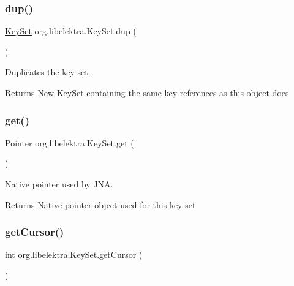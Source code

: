 \subsubsection{\texorpdfstring{dup()}{dup()}}
{\footnotesize\ttfamily \hyperlink{classorg_1_1libelektra_1_1KeySet}{Key\+Set} org.\+libelektra.\+Key\+Set.\+dup (\begin{DoxyParamCaption}{ }\end{DoxyParamCaption})\hspace{0.3cm}{\ttfamily [inline]}}



Duplicates the key set. 

\begin{DoxyReturn}{Returns}
New \hyperlink{classorg_1_1libelektra_1_1KeySet}{Key\+Set} containing the same key references as this object does 
\end{DoxyReturn}
\mbox{\label{classorg_1_1libelektra_1_1KeySet_abf3f028c9c3b88a47aa9d67a5c8e95da}} 
\subsubsection{\texorpdfstring{get()}{get()}}
{\footnotesize\ttfamily Pointer org.\+libelektra.\+Key\+Set.\+get (\begin{DoxyParamCaption}{ }\end{DoxyParamCaption})\hspace{0.3cm}{\ttfamily [inline]}}



Native pointer used by J\+NA. 

\begin{DoxyReturn}{Returns}
Native pointer object used for this key set 
\end{DoxyReturn}
\mbox{\label{classorg_1_1libelektra_1_1KeySet_a37e6d574b4595021a6cc732e325219e1}} 
\subsubsection{\texorpdfstring{get\+Cursor()}{getCursor()}}
{\footnotesize\ttfamily int org.\+libelektra.\+Key\+Set.\+get\+Cursor (\begin{DoxyParamCaption}{ }\end{DoxyParamCaption})\hspace{0.3cm}{\ttfamily [inline]}}



